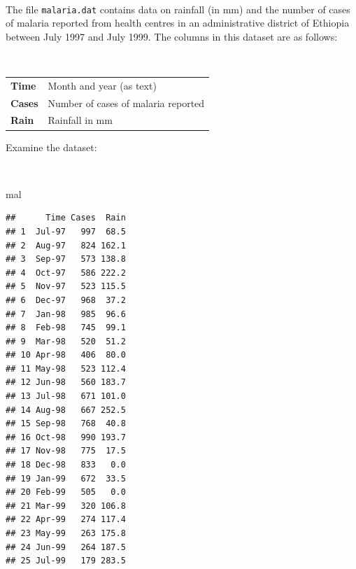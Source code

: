 \documentclass[12pt,a4paper]{book}
\newenvironment{Shaded}{\begin{snugshade}}{\end{snugshade}}
\newcommand{\NormalTok}[1]{#1}
\theoremstyle{definition}
\theoremstyle{definition}
\theoremstyle{definition}
\theoremstyle{remark}
\begin{document}
~

The file \texttt{malaria.dat} contains data on rainfall (in mm) and the
number of cases of malaria reported from health centres in an
administrative district of Ethiopia between July 1997 and July 1999. The
columns in this dataset are as follows:

~

\begin{longtable}[]{@{}ll@{}}
\toprule
\begin{minipage}[t]{0.14\columnwidth}\raggedright
\textbf{Time}\strut
\end{minipage} & \begin{minipage}[t]{0.54\columnwidth}\raggedright
Month and year (as text)\strut
\end{minipage}\tabularnewline
\begin{minipage}[t]{0.14\columnwidth}\raggedright
\textbf{Cases}\strut
\end{minipage} & \begin{minipage}[t]{0.54\columnwidth}\raggedright
Number of cases of malaria reported\strut
\end{minipage}\tabularnewline
\begin{minipage}[t]{0.14\columnwidth}\raggedright
\textbf{Rain}\strut
\end{minipage} & \begin{minipage}[t]{0.54\columnwidth}\raggedright
Rainfall in mm\strut
\end{minipage}\tabularnewline
\bottomrule
\end{longtable}

\newpage

Examine the dataset:

~

\begin{Shaded}
\begin{Highlighting}[]
\NormalTok{mal}
\end{Highlighting}
\end{Shaded}

\begin{verbatim}
##      Time Cases  Rain
## 1  Jul-97   997  68.5
## 2  Aug-97   824 162.1
## 3  Sep-97   573 138.8
## 4  Oct-97   586 222.2
## 5  Nov-97   523 115.5
## 6  Dec-97   968  37.2
## 7  Jan-98   985  96.6
## 8  Feb-98   745  99.1
## 9  Mar-98   520  51.2
## 10 Apr-98   406  80.0
## 11 May-98   523 112.4
## 12 Jun-98   560 183.7
## 13 Jul-98   671 101.0
## 14 Aug-98   667 252.5
## 15 Sep-98   768  40.8
## 16 Oct-98   990 193.7
## 17 Nov-98   775  17.5
## 18 Dec-98   833   0.0
## 19 Jan-99   672  33.5
## 20 Feb-99   505   0.0
## 21 Mar-99   320 106.8
## 22 Apr-99   274 117.4
## 23 May-99   263 175.8
## 24 Jun-99   264 187.5
## 25 Jul-99   179 283.5
\end{verbatim}
\end{document}
